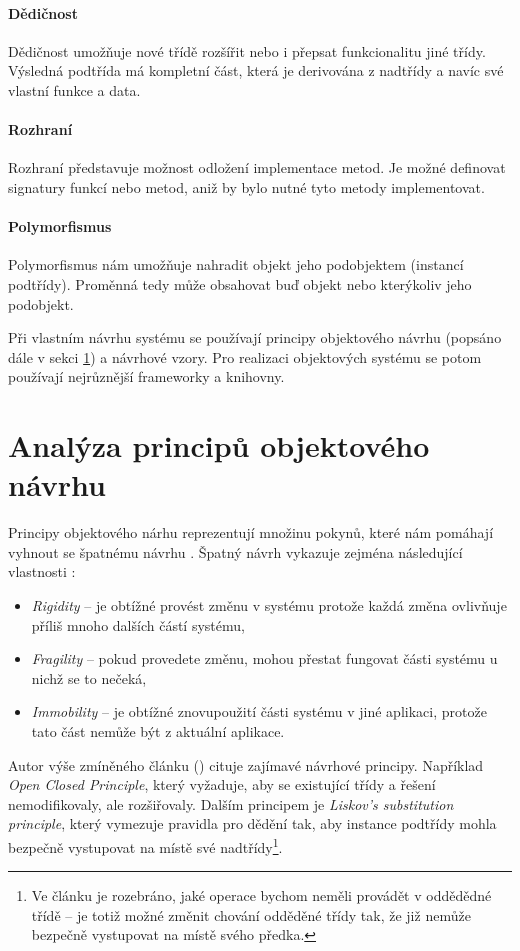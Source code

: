 \paragraph{Dědičnost} Dědičnost umožňuje nové třídě rozšířit nebo i přepsat funkcionalitu jiné třídy. Výsledná podtřída má kompletní část, která je derivována z nadtřídy a navíc své vlastní funkce a data.
\paragraph{Rozhraní} Rozhraní představuje možnost odložení implementace metod. Je možné definovat signatury funkcí nebo metod, aniž by bylo nutné tyto metody implementovat.
\paragraph{Polymorfismus} Polymorfismus nám umožňuje nahradit objekt jeho podobjektem (instancí podtřídy). Proměnná tedy může obsahovat buď objekt nebo kterýkoliv jeho podobjekt.

Při vlastním návrhu systému se používají principy objektového návrhu (popsáno dále v sekci \ref{analysis-oop_design_principles}) a návrhové vzory. Pro realizaci objektových systému se potom používají nejrůznější frameworky a knihovny.

\section{Analýza principů objektového návrhu}
\label{analysis-oop_design_principles}

Principy objektového nárhu reprezentují množinu pokynů, které nám pomáhají vyhnout se špatnému návrhu \cite{oop_design_principles}. Špatný návrh vykazuje zejména následující vlastnosti \cite{oop_design_principles_and_patterns}:

\begin{itemize}
\item \emph{Rigidity} -- je obtížné provést změnu v systému protože každá změna ovlivňuje příliš mnoho dalších částí systému,
\item \emph{Fragility} -- pokud provedete změnu, mohou přestat fungovat části systému u nichž se to nečeká,
\item \emph{Immobility} -- je obtížné znovupoužití části systému v jiné aplikaci, protože tato část nemůže být  z aktuální aplikace.
\end{itemize}

Autor výše zmíněného článku (\cite{oop_design_principles_and_patterns}) cituje zajímavé návrhové principy. Například \emph{Open Closed Principle}, který vyžaduje, aby se existující třídy a řešení nemodifikovaly, ale rozšiřovaly. Dalším principem je \emph{Liskov's substitution principle}, který vymezuje pravidla pro dědění tak, aby instance podtřídy mohla bezpečně vystupovat na místě své nadtřídy\footnote{Ve článku je rozebráno, jaké operace bychom neměli provádět v oddědědné třídě -- je totiž možné změnit chování odděděné třídy tak, že již nemůže bezpečně vystupovat na místě svého předka.}.

